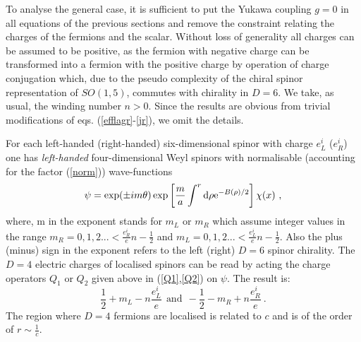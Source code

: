 \documentclass[a4paper,12pt]{article}
\begin{document}
To analyse the general case, it is sufficient to put the Yukawa
coupling  $g=0$ in all equations of the previous sections and remove
the  constraint relating the charges of the fermions and  the scalar.
Without loss of generality all charges can be assumed to be positive,
as the fermion with negative charge can be transformed into a fermion
with the positive charge by operation of charge conjugation which,
due to the pseudo complexity of the chiral spinor representation of
$SO(1,5)$, commutes with chirality in $D=6$. We take, as usual, the
winding number $n>0$.  Since the results are obvious from trivial
modifications of  eqs. (\ref{efflagr}-\ref{jr}), we omit the
details. 

For each left-handed (right-handed) six-dimensional spinor with
charge $e_L^i$ ($e_R^i$) one has  {\it left-handed} four-dimensional
Weyl spinors with normalisable (accounting for the factor
(\ref{norm})) wave-functions
\begin{equation}
\psi=\exp(\pm im\theta)\exp\left[\frac{m}{a} \int^r{\rm
d}\rho{\rm e}^{-B(\rho)/2}\right]\chi(x)~,
\end{equation}
where, m in the exponent stands for $m_L$ or $m_R$  which assume  
integer values in the range
$ m_R= 0, 1, 2 ... <
 \frac{e_R^i}{e}n-\frac{1}{2}$ and $ m_L= 0, 1, 2 ... <
 \frac{e_L^i}{e}n-\frac{1}{2}$. Also  
the plus (minus) sign  in the exponent refers to  the left (right)
$D=6$ spinor chirality. The $D=4$ electric charges of localised
spinors can be read by acting the charge operators $Q_1$ or $Q_2$
given above in (\ref{Q1},\ref{Q2}) on $\psi$. The result is:
\begin{equation}
\frac{1}{2} + m_L -n\frac{e_L^i}{e}~~ \mbox{and}~~ -\frac{1}{2} - m_R
+n\frac{e_R^i}{e}~.
\end{equation}
The region where $D=4$ fermions are localised is related to $c$ and
is of the order of $r \sim \frac{1}{c}$.
\end{document}
